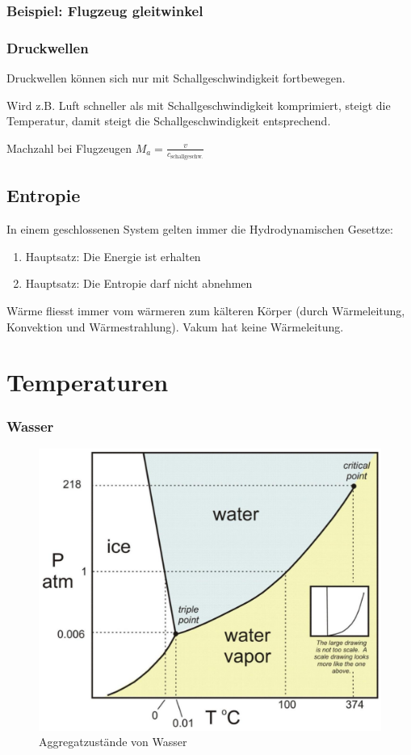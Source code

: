 \documentclass[a4paper]{scrartcl}
\begin{document}

\subsubsection{Beispiel: Flugzeug gleitwinkel}



\subsubsection{Druckwellen}

Druckwellen können sich nur mit Schallgeschwindigkeit fortbewegen.

Wird z.B. Luft schneller als mit Schallgeschwindigkeit komprimiert, steigt die Temperatur, damit steigt die Schallgeschwindigkeit entsprechend.

Machzahl bei Flugzeugen $M_a = \frac{v}{c_{\text{schallgeschw.}}}$




\subsection{Entropie}

In einem geschlossenen System gelten immer die Hydrodynamischen Gesettze:

\begin{enumerate}
	\item Hauptsatz: Die Energie ist erhalten
	\item Hauptsatz: Die Entropie darf nicht abnehmen
\end{enumerate}

Wärme fliesst immer vom wärmeren zum kälteren Körper (durch Wärmeleitung, Konvektion und Wärmestrahlung). Vakum hat keine Wärmeleitung.


\section{Temperaturen}

\subsubsection{Wasser}

\begin{figure}[h]
	\centering
	\includegraphics[width=0.7\linewidth]{img/wasser_aggregatszustaende}
	\caption{Aggregatzustände von Wasser}
	\label{fig:wasseraggregatszustaende}
\end{figure}
\end{document}
